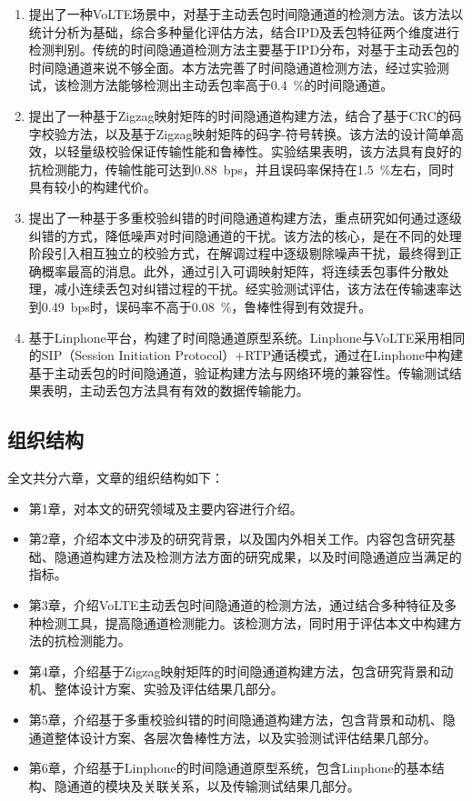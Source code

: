 \begin{enumerate}
    \item 提出了一种VoLTE场景中，对基于主动丢包时间隐通道的检测方法。该方法以统计分析为基础，综合多种量化评估方法，结合IPD及丢包特征两个维度进行检测判别。传统的时间隐通道检测方法主要基于IPD分布，对基于主动丢包的时间隐通道来说不够全面。本方法完善了时间隐通道检测方法，经过实验测试，该检测方法能够检测出主动丢包率高于{0.4\ \%}的时间隐通道。
    \item 提出了一种基于Zigzag映射矩阵的时间隐通道构建方法，结合了基于CRC的码字校验方法，以及基于Zigzag映射矩阵的码字-符号转换。该方法的设计简单高效，以轻量级校验保证传输性能和鲁棒性。实验结果表明，该方法具有良好的抗检测能力，传输性能可达到{0.88\ bps}，并且误码率保持在{1.5\ \%}左右，同时具有较小的构建代价。
    \item 提出了一种基于多重校验纠错的时间隐通道构建方法，重点研究如何通过逐级纠错的方式，降低噪声对时间隐通道的干扰。该方法的核心，是在不同的处理阶段引入相互独立的校验方式，在解调过程中逐级剔除噪声干扰，最终得到正确概率最高的消息。此外，通过引入可调映射矩阵，将连续丢包事件分散处理，减小连续丢包对纠错过程的干扰。经实验测试评估，该方法在传输速率达到{0.49\ bps}时，误码率不高于{0.08\ \%}，鲁棒性得到有效提升。
    \item 基于Linphone平台，构建了时间隐通道原型系统。Linphone与VoLTE采用相同的SIP（Session Initiation Protocol）+RTP通话模式，通过在Linphone中构建基于主动丢包的时间隐通道，验证构建方法与网络环境的兼容性。传输测试结果表明，主动丢包方法具有有效的数据传输能力。
\end{enumerate}

\subsection{组织结构}
\label{sec:intro:work:struct}

全文共分六章，文章的组织结构如下：
\begin{itemize}
    \item 第1章，对本文的研究领域及主要内容进行介绍。
    \item 第2章，介绍本文中涉及的研究背景，以及国内外相关工作。内容包含研究基础、隐通道构建方法及检测方法方面的研究成果，以及时间隐通道应当满足的指标。
    \item 第3章，介绍VoLTE主动丢包时间隐通道的检测方法，通过结合多种特征及多种检测工具，提高隐通道检测能力。该检测方法，同时用于评估本文中构建方法的抗检测能力。
    \item 第4章，介绍基于Zigzag映射矩阵的时间隐通道构建方法，包含研究背景和动机、整体设计方案、实验及评估结果几部分。
    \item 第5章，介绍基于多重校验纠错的时间隐通道构建方法，包含背景和动机、隐通道整体设计方案、各层次鲁棒性方法，以及实验测试评估结果几部分。
    \item 第6章，介绍基于Linphone的时间隐通道原型系统，包含Linphone的基本结构、隐通道的模块及关联关系，以及传输测试结果几部分。
\end{itemize}